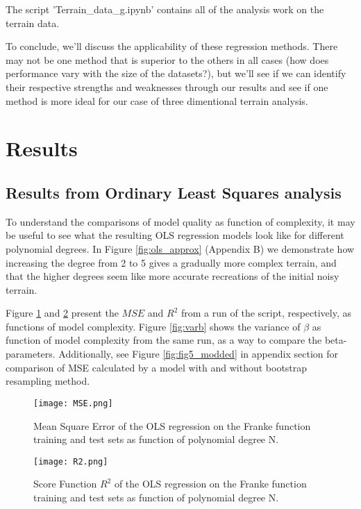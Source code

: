 \documentclass[reprint,english,notitlepage]{revtex4-1}  %
\begin{document}
The script 'Terrain\_data\_g.ipynb' contains all of the analysis work on the terrain data.

To conclude, we'll discuss the applicability of these regression methods. There may not be one method that is superior to the others in all cases (how does performance vary with the size of the datasets?), but we'll see if we can identify their respective strengths and weaknesses through our results and see if one method is more ideal for our case of three dimentional terrain analysis. 

\section{Results}

\subsection{Results from Ordinary Least Squares analysis}

To understand the comparisons of model quality as function of complexity, it may be useful to see what the resulting OLS regression models look like for different polynomial degrees. In Figure \ref{fig:ols_approx} (Appendix B) we demonstrate how increasing the degree from 2 to 5 gives a gradually more complex terrain, and that the higher degrees seem like more accurate recreations of the initial noisy terrain.

Figure \ref{fig:5} and \ref{fig:6} present the $MSE$ and $R^2$ from a run of the script, respectively, as functions of model complexity. Figure \ref{fig:varb} shows the variance of $\beta$ as function of model complexity from the same run, as a way to compare the beta-parameters. Additionally, see Figure \ref{fig:fig5_modded} in appendix section for comparison of MSE calculated by a model with and without bootstrap resampling method.

\begin{figure}[h!]
    \centering
    \texttt{[image: MSE.png]}
    \caption{Mean Square Error of the OLS regression on the Franke function training and test sets as function of polynomial degree N.}
    \label{fig:5}
\end{figure}

\begin{figure}[h!]
    \centering
    \texttt{[image: R2.png]}
    \caption{Score Function $R^2$ of the OLS regression on the Franke function training and test sets as function of polynomial degree N.}
    \label{fig:6}
\end{figure}
\end{document}
